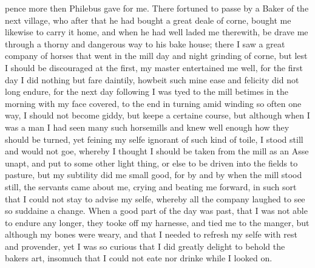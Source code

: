 pence more then Philebus gave for me. There fortuned to passe by a Baker of the
next village, who after that he had bought a great deale of corne, bought me
likewise to carry it home, and when he had well laded me therewith, be drave me
through a thorny and dangerous way to his bake house; there I saw a great
company of horses that went in the mill day and night grinding of corne, but
lest I should be discouraged at the first, my master entertained me well, for
the first day I did nothing but fare daintily, howbeit such mine ease and
felicity did not long endure, for the next day following I was tyed to the mill
betimes in the morning with my face covered, to the end in turning amid winding
so often one way, I should not become giddy, but keepe a certaine course, but
although when I was a man I had seen many such horsemills and knew well enough
how they should be turned, yet feining my selfe ignorant of such kind of toile,
I stood still and would not goe, whereby I thought I should be taken from the
mill as an Asse unapt, and put to some other light thing, or else to be driven
into the fields to pasture, but my subtility did me small good, for by and by
when the mill stood still, the servants came about me, crying and beating me
forward, in such sort that I could not stay to advise my selfe, whereby all the
company laughed to see so suddaine a change. When a good part of the day was
past, that I was not able to endure any longer, they tooke off my harnesse, and
tied me to the manger, but although my bones were weary, and that I needed to
refresh my selfe with rest and provender, yet I was so curious that I did
greatly delight to behold the bakers art, insomuch that I could not eate nor
drinke while I looked on.

